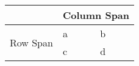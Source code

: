 \begin{table}[]
    \begin{tabular}{@{}lll@{}}
    \toprule
    \textbf{} & \multicolumn{2}{l}{Column Span} \\ \midrule
    \multirow{2}{*}{Row Span} & a & b \\
     & c & d \\ \cmidrule(l){2-3} 
    \end{tabular}
\end{table}
